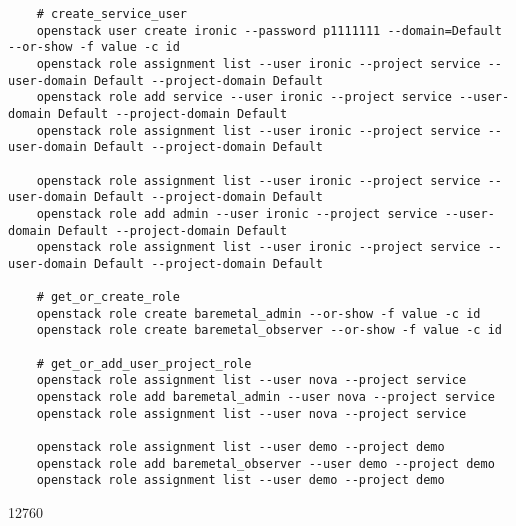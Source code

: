 \documentclass[a4paper,left=1.5cm,right=1.5cm,11pt]{article}
\begin{document}
\begin{lstlisting}
	# create_service_user
	openstack user create ironic --password p1111111 --domain=Default --or-show -f value -c id
	openstack role assignment list --user ironic --project service --user-domain Default --project-domain Default
	openstack role add service --user ironic --project service --user-domain Default --project-domain Default
    openstack role assignment list --user ironic --project service --user-domain Default --project-domain Default

	openstack role assignment list --user ironic --project service --user-domain Default --project-domain Default
	openstack role add admin --user ironic --project service --user-domain Default --project-domain Default
	openstack role assignment list --user ironic --project service --user-domain Default --project-domain Default

	# get_or_create_role
	openstack role create baremetal_admin --or-show -f value -c id
	openstack role create baremetal_observer --or-show -f value -c id

	# get_or_add_user_project_role
	openstack role assignment list --user nova --project service
	openstack role add baremetal_admin --user nova --project service
	openstack role assignment list --user nova --project service

	openstack role assignment list --user demo --project demo
	openstack role add baremetal_observer --user demo --project demo
	openstack role assignment list --user demo --project demo
	\end{lstlisting}

	12760
\end{document}
